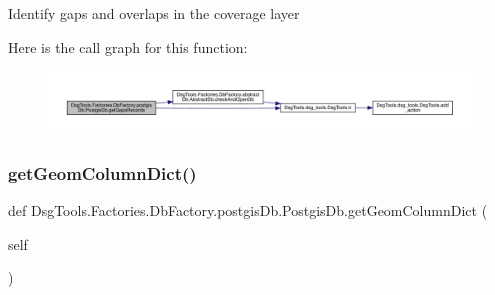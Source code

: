\begin{DoxyVerb}Identify gaps and overlaps in the coverage layer
\end{DoxyVerb}
 Here is the call graph for this function\+:
\nopagebreak
\begin{figure}[H]
\begin{center}
\leavevmode
\includegraphics[width=350pt]{class_dsg_tools_1_1_factories_1_1_db_factory_1_1postgis_db_1_1_postgis_db_a650039fe21c0c2ecf52984150a7e12e8_cgraph}
\end{center}
\end{figure}
\mbox{\label{class_dsg_tools_1_1_factories_1_1_db_factory_1_1postgis_db_1_1_postgis_db_a8be34572229ea3f0a90d93678ca80eaa}} 
\subsubsection{\texorpdfstring{get\+Geom\+Column\+Dict()}{getGeomColumnDict()}}
{\footnotesize\ttfamily def Dsg\+Tools.\+Factories.\+Db\+Factory.\+postgis\+Db.\+Postgis\+Db.\+get\+Geom\+Column\+Dict (\begin{DoxyParamCaption}\item[{}]{self }\end{DoxyParamCaption})}

